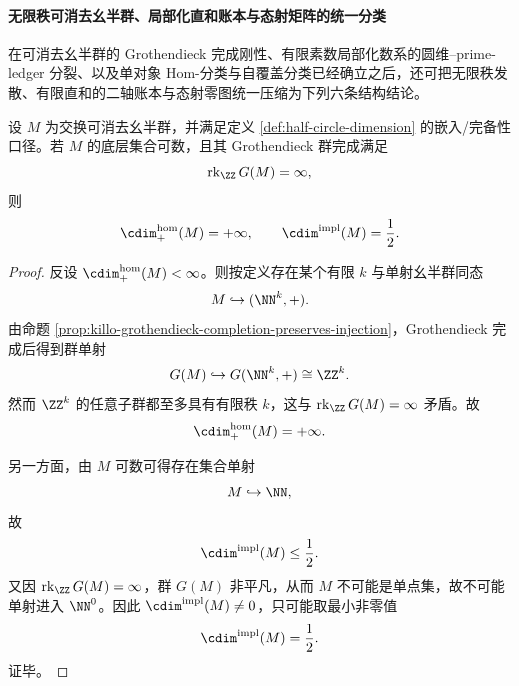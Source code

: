 \paragraph{无限秩可消去幺半群、局部化直和账本与态射矩阵的统一分类}
在可消去幺半群的 Grothendieck 完成刚性、有限素数局部化数系的圆维--prime-ledger 分裂、以及单对象 \(\mathrm{Hom}\)-分类与自覆盖分类已经确立之后，还可把无限秩发散、有限直和的二轴账本与态射零图统一压缩为下列六条结构结论。

\begin{theorem}\label{thm:xi-infinite-grothendieck-rank-halfdimension-divergence}
设 \(M\) 为交换可消去幺半群，并满足定义 \ref{def:half-circle-dimension} 的嵌入/完备性口径。若 \(M\) 的底层集合可数，且其 Grothendieck 群完成满足
\[
\operatorname{rk}_{\ZZ}G(M)=\infty,
\]
则
\[
\cdim^{\mathrm{hom}}_{+}(M)=+\infty,
\qquad
\cdim^{\mathrm{impl}}(M)=\frac12.
\]
\end{theorem}
\begin{proof}
反设 \(\cdim^{\mathrm{hom}}_{+}(M)<\infty\)。则按定义存在某个有限 \(k\) 与单射幺半群同态
\[
M\hookrightarrow (\NN^k,+).
\]
由命题 \ref{prop:killo-grothendieck-completion-preserves-injection}，Grothendieck 完成后得到群单射
\[
G(M)\hookrightarrow G(\NN^k,+)\cong \ZZ^k.
\]
然而 \(\ZZ^k\) 的任意子群都至多具有有限秩 \(k\)，这与 \(\operatorname{rk}_{\ZZ}G(M)=\infty\) 矛盾。故
\[
\cdim^{\mathrm{hom}}_{+}(M)=+\infty.
\]

另一方面，由 \(M\) 可数可得存在集合单射
\[
M\hookrightarrow \NN,
\]
故
\[
\cdim^{\mathrm{impl}}(M)\le \frac12.
\]
又因 \(\operatorname{rk}_{\ZZ}G(M)=\infty\)，群 \(G(M)\) 非平凡，从而 \(M\) 不可能是单点集，故不可能单射进入 \(\NN^0\)。因此 \(\cdim^{\mathrm{impl}}(M)\neq 0\)，只可能取最小非零值
\[
\cdim^{\mathrm{impl}}(M)=\frac12.
\]
证毕。
\end{proof}

